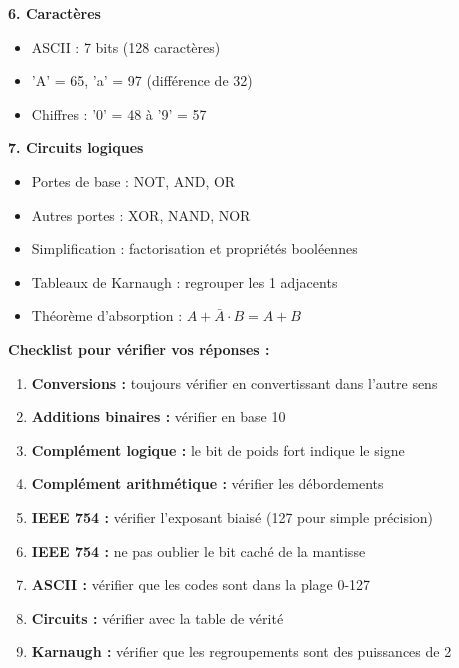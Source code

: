 \documentclass[12pt,a4paper]{article}
\begin{document}
\begin{remarque}
\textbf{6. Caractères}
\begin{itemize}
    \item ASCII : 7 bits (128 caractères)
    \item 'A' = 65, 'a' = 97 (différence de 32)
    \item Chiffres : '0' = 48 à '9' = 57
\end{itemize}

\textbf{7. Circuits logiques}
\begin{itemize}
    \item Portes de base : NOT, AND, OR
    \item Autres portes : XOR, NAND, NOR
    \item Simplification : factorisation et propriétés booléennes
    \item Tableaux de Karnaugh : regrouper les 1 adjacents
    \item Théorème d'absorption : $A + \bar{A} \cdot B = A + B$
\end{itemize}
\end{remarque}

\newpage
\begin{methode}
\textbf{Checklist pour vérifier vos réponses :}

\begin{enumerate}
    \item \textbf{Conversions :} toujours vérifier en convertissant dans l'autre sens
    \item \textbf{Additions binaires :} vérifier en base 10
    \item \textbf{Complément logique :} le bit de poids fort indique le signe
    \item \textbf{Complément arithmétique :} vérifier les débordements
    \item \textbf{IEEE 754 :} vérifier l'exposant biaisé (127 pour simple précision)
    \item \textbf{IEEE 754 :} ne pas oublier le bit caché de la mantisse
    \item \textbf{ASCII :} vérifier que les codes sont dans la plage 0-127
    \item \textbf{Circuits :} vérifier avec la table de vérité
    \item \textbf{Karnaugh :} vérifier que les regroupements sont des puissances de 2
\end{enumerate}
\end{methode}
\end{document}
